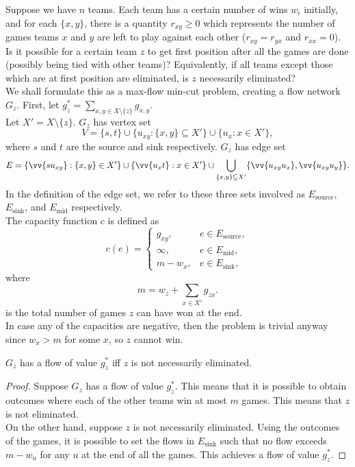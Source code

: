 		Suppose we have $n$ teams. Each team has a certain number of wins $w_i$ initially, and for each $\{x,y\}$, there is a quantity $r_{xy}\geq 0$ which represents the number of games teams $x$ and $y$ are left to play against each other ($r_{xy} = r_{yx}$ and $r_{xx}=0$). Is it possible for a certain team $z$ to get first position after all the games are done (possibly being tied with other teams)? Equivalently, if all teams except those which are at first position are eliminated, is $z$ necessarily eliminated?\\

		We shall formulate this as a max-flow min-cut problem, creating a flow network $G_z$. First, let $g_z^* = \sum_{x,y \in X\setminus\{z\}} g_{x,y}$.\\

		Let $X' = X \setminus \{z\}$. $G_z$ has vertex set
		\[ V = \{s,t\} \cup \{u_{xy} : \{x,y\}\subseteq X'\} \cup \{u_x : x \in X'\}, \]
		where $s$ and $t$ are the source and sink respectively. $G_z$ has edge set
		\[ E = \{\vv{s u_{xy}} : \{x,y\}\in X'\} \cup \{\vv{u_x t} : x \in X'\} \cup \bigcup_{\{x,y\}\subseteq X'} \{\vv{u_{xy}u_x},\vv{u_{xy}u_y}\}. \]
		In the definition of the edge set, we refer to these three sets involved as $E_\text{source}$, $E_\text{sink}$, and $E_\text{mid}$ respectively.\\
		The capacity function $c$ is defined as
		\[
			c(e) =
			\begin{cases}
				g_{xy}, & e \in E_\text{source}, \\
				\infty, & e \in E_\text{mid}, \\
				m - w_x, & e \in E_\text{sink},
			\end{cases}
		\]
		where 
		\[ m = w_z + \sum_{x\in X'} g_{zx}. \]
		is the total number of games $z$ can have won at the end.\\
		In case any of the capacities are negative, then the problem is trivial anyway since $w_x > m$ for some $x$, so $z$ cannot win.

		\begin{lemma}
			$G_z$ has a flow of value $g_z^*$ iff $z$ is not necessarily eliminated.
		\end{lemma}
		\begin{proof}
			Suppose $G_z$ has a flow of value $g_z^*$. This means that it is possible to obtain outcomes where each of the other teams win at most $m$ games. This means that $z$ is not eliminated.\\
			On the other hand, suppose $z$ is not necessarily eliminated. Using the outcomes of the games, it is possible to set the flows in $E_\text{sink}$ such that no flow exceeds $m - w_u$ for any $u$ at the end of all the games. This achieves a flow of value $g_z^*$.
		\end{proof}

